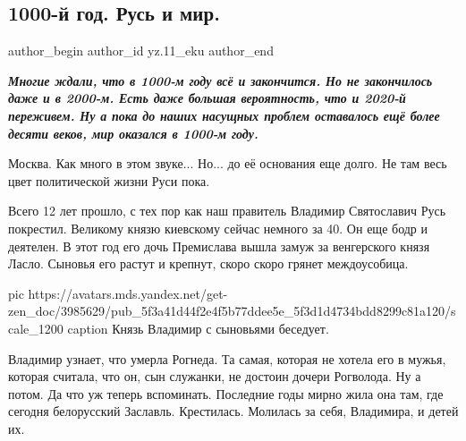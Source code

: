  
 
 
 
 
 
\subsection{1000-й год. Русь и мир.}
\label{sec:20_08_2020.sites.ru.zen_yandex.yz.11_eku.1.1000_god_rus_i_mir}
\ifcmt
  author_begin
   author_id yz.11_eku
  author_end
\fi

\begin{leftbar}
  \begingroup
    \em\Large\bfseries\color{blue}
Многие ждали, что в 1000-м году всё и закончится. Но не закончилось даже и в
2000-м. Есть даже большая вероятность, что и 2020-й переживем. Ну а пока до
наших насущных проблем оставалось ещё более десяти веков, мир оказался в 1000-м
году.
  \endgroup
\end{leftbar}

Москва. Как много в этом звуке... Но... до её основания еще долго. Не там весь
цвет политической жизни Руси пока.

Всего 12 лет прошло, с тех пор как наш правитель Владимир Святославич Русь
покрестил. Великому князю киевскому сейчас немного за 40. Он еще бодр и
деятелен. В этот год его дочь Премислава вышла замуж за венгерского князя
Ласло. Сыновья его растут и крепнут, скоро скоро грянет междоусобица. 

\ifcmt
pic https://avatars.mds.yandex.net/get-zen_doc/3985629/pub_5f3a41d44f2e4f5b77ddee5e_5f3d1d4734bdd8299c81a120/scale_1200
caption Князь Владимир с сыновьями беседует.
\fi

Владимир узнает, что умерла Рогнеда. Та самая, которая не хотела его в мужья,
которая считала, что он, сын служанки, не достоин дочери Рогволода. Ну а потом.
Да что уж теперь вспоминать. Последние годы мирно жила она там, где сегодня
белорусский Заславль. Крестилась. Молилась за себя, Владимира, и детей их.

